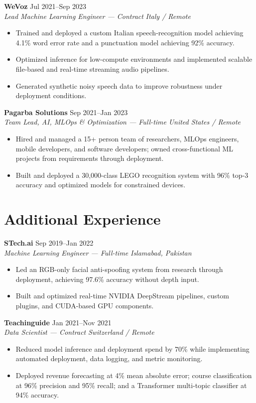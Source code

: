 \documentclass[10pt,letterpaper]{article}
\newcommand{\job}[4]{%
  \textbf{#1} \hfill #2\\
  \textit{#3} \hfill \textit{#4}\vspace{1pt}
}
\begin{document}
\job{WeVoz}{Jul 2021--Sep 2023}{Lead Machine Learning Engineer --- Contract}{Italy / Remote}
\begin{itemize}
  \item Trained and deployed a custom Italian speech-recognition model achieving 4.1\% word error rate and a punctuation model achieving 92\% accuracy.
  \item Optimized inference for low-compute environments and implemented scalable file-based and real-time streaming audio pipelines.
  \item Generated synthetic noisy speech data to improve robustness under deployment conditions.
\end{itemize}

\job{Pagarba Solutions}{Sep 2021--Jan 2023}{Team Lead, AI, MLOps \& Optimization --- Full-time}{United States / Remote}
\begin{itemize}
  \item Hired and managed a 15+ person team of researchers, MLOps engineers, mobile developers, and software developers; owned cross-functional ML projects from requirements through deployment.
  \item Built and deployed a 30,000-class LEGO recognition system with 96\% top-3 accuracy and optimized models for constrained devices.
\end{itemize}

\section*{Additional Experience}

\job{STech.ai}{Sep 2019--Jan 2022}{Machine Learning Engineer --- Full-time}{Islamabad, Pakistan}
\begin{itemize}
  \item Led an RGB-only facial anti-spoofing system from research through deployment, achieving 97.6\% accuracy without depth input.
  \item Built and optimized real-time NVIDIA DeepStream pipelines, custom plugins, and CUDA-based GPU components.
\end{itemize}

\job{Teachinguide}{Jan 2021--Nov 2021}{Data Scientist --- Contract}{Switzerland / Remote}
\begin{itemize}
  \item Reduced model inference and deployment spend by 70\% while implementing automated deployment, data logging, and metric monitoring.
  \item Deployed revenue forecasting at 4\% mean absolute error; course classification at 96\% precision and 95\% recall; and a Transformer multi-topic classifier at 94\% accuracy.
\end{itemize}
\end{document}
